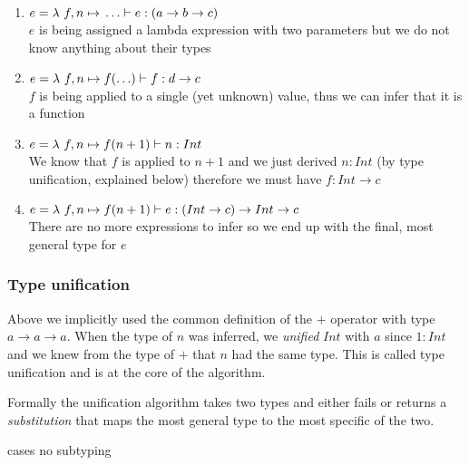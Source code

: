 \begin{enumerate}
\item $e = \lambda{} \ f, n \mapsto{} \ldots \vdash e: (a \to b \to c)$ \\
  $e$ is being assigned a lambda expression with two parameters but we do not know anything about their types
\item $e = \lambda{} \ f, n \mapsto{} f(\ldots) \vdash f: d \to c$ \\
  $f$ is being applied to a single (yet unknown) value, thus we can infer that it is a function
\item $e = \lambda{} \ f, n \mapsto{} f(n + 1) \vdash n : Int$ \\
  We know that $f$ is applied to $n+1$ and we just derived $n:Int$ (by type unification, explained below) therefore we must have $f:Int \to c$
\item $e = \lambda{} \ f, n \mapsto{} f(n + 1) \vdash e : (Int \to c) \to Int \to c$ \\
  There are no more expressions to infer so we end up with the final, most general type for $e$
\end{enumerate}


\subsubsection{Type unification}
Above we implicitly used the common definition of the $+$ operator with type $a \to a \to a$. When the type of $n$ was inferred, we \emph{unified} $Int$ with $a$ since $1 : Int$ and we knew from the type of $+$ that $n$ had the same type. This is called type unification and is at the core of the algorithm.

Formally the unification algorithm takes two types and either fails or returns a \emph{substitution} that maps the most general type to the most specific of the two.


cases
no subtyping



